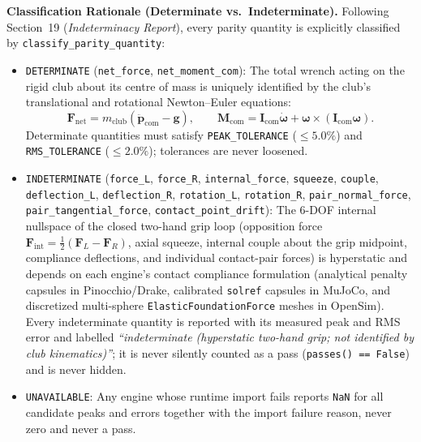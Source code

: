 \documentclass[11pt,a4paper]{article}
\begin{document}
\textbf{Classification Rationale (Determinate vs.\ Indeterminate).} Following  Section~19 (\textit{Indeterminacy Report}), every parity quantity is explicitly classified by \texttt{classify\_parity\_quantity}:
\begin{itemize}[leftmargin=*,noitemsep]
\item \texttt{DETERMINATE} (\texttt{net\_force}, \texttt{net\_moment\_com}): The total wrench acting on the rigid club about its centre of mass is uniquely identified by the club's translational and rotational Newton--Euler equations:
\begin{equation}
\mathbf{F}_{\mathrm{net}} = m_{\mathrm{club}}(\ddot{\mathbf{p}}_{\mathrm{com}} - \mathbf{g}), \qquad
\mathbf{M}_{\mathrm{com}} = \mathbf{I}_{\mathrm{com}}\dot{\boldsymbol{\omega}} + \boldsymbol{\omega} \times (\mathbf{I}_{\mathrm{com}}\boldsymbol{\omega}).
\end{equation}
Determinate quantities must satisfy \texttt{PEAK\_TOLERANCE} ($\le 5.0\%$) and \texttt{RMS\_TOLERANCE} ($\le 2.0\%$); tolerances are never loosened.
\item \texttt{INDETERMINATE} (\texttt{force\_L}, \texttt{force\_R}, \texttt{internal\_force}, \texttt{squeeze}, \texttt{couple}, \texttt{deflection\_L}, \texttt{deflection\_R}, \texttt{rotation\_L}, \texttt{rotation\_R}, \texttt{pair\_normal\_force}, \texttt{pair\_tangential\_force}, \texttt{contact\_point\_drift}): The 6-DOF internal nullspace of the closed two-hand grip loop (opposition force $\mathbf{F}_{\mathrm{int}} = \tfrac{1}{2}(\mathbf{F}_L - \mathbf{F}_R)$, axial squeeze, internal couple about the grip midpoint, compliance deflections, and individual contact-pair forces) is hyperstatic and depends on each engine's contact compliance formulation (analytical penalty capsules in Pinocchio/Drake, calibrated \texttt{solref} capsules in MuJoCo, and discretized multi-sphere \texttt{ElasticFoundationForce} meshes in OpenSim). Every indeterminate quantity is reported with its measured peak and RMS error and labelled \textit{``indeterminate (hyperstatic two-hand grip; not identified by club kinematics)''}; it is never silently counted as a pass (\texttt{passes() == False}) and is never hidden.
\item \texttt{UNAVAILABLE}: Any engine whose runtime import fails reports \texttt{NaN} for all candidate peaks and errors together with the import failure reason, never zero and never a pass.
\end{itemize}
\end{document}
